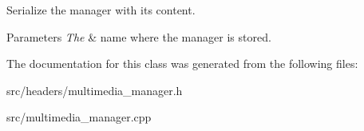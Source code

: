 Serialize the manager with its content. 


\begin{DoxyParams}{Parameters}
{\em The} & name where the manager is stored. \\
\hline
\end{DoxyParams}


The documentation for this class was generated from the following files\-:\begin{DoxyCompactItemize}
\item 
src/headers/multimedia\-\_\-manager.\-h\item 
src/multimedia\-\_\-manager.\-cpp\end{DoxyCompactItemize}
